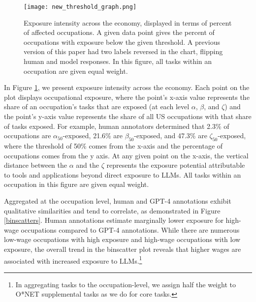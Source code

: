 \documentclass[11pt]{article}
\begin{document}
\begin{figure}
    \centering
    
     \texttt{[image: new\_threshold\_graph.png]}
    \caption{Exposure intensity across the economy, displayed in terms of percent of affected occupations. A given data point gives the percent of occupations with exposure below the given threshold. A previous version of this paper had two labels reversed in the chart, flipping human and model responses. In this figure, all tasks within an occupation are given equal weight.}
\label{fig:exposure_final}
\end{figure}

In Figure \ref{fig:exposure_final}, we present exposure intensity across the economy. Each point on the plot displays occupational exposure, where the point's x-axis value represents the share of an occupation's tasks that are exposed (at each level $\alpha$, $\beta$, and $\zeta$) and the point's y-axis value represents the share of all US occupations with that share of tasks exposed. For example, human annotators determined that 2.3\% of occupations are $\alpha_{50}$-exposed, 21.6\% are $\beta_{50}$-exposed, and 47.3\% are $\zeta_{50}$-exposed, where the threshold of 50\% comes from the x-axis and the percentage of occupations comes from the y axis. At any given point on the x-axis, the vertical distance between the $\alpha$ and the $\zeta$ represents the exposure potential attributable to tools and applications beyond direct exposure to LLMs. All tasks within an occupation in this figure are given equal weight. 

Aggregated at the occupation level, human and GPT-4 annotations exhibit qualitative similarities and tend to correlate, as demonstrated in Figure \ref{binscatters}. Human annotations estimate marginally lower exposure for high-wage occupations compared to GPT-4 annotations. While there are numerous low-wage occupations with high exposure and high-wage occupations with low exposure, the overall trend in the binscatter plot reveals that higher wages are associated with increased exposure to LLMs.\footnote{In aggregating tasks to the occupation-level, we assign half the weight to O*NET supplemental tasks as we do for core tasks.}
\end{document}
